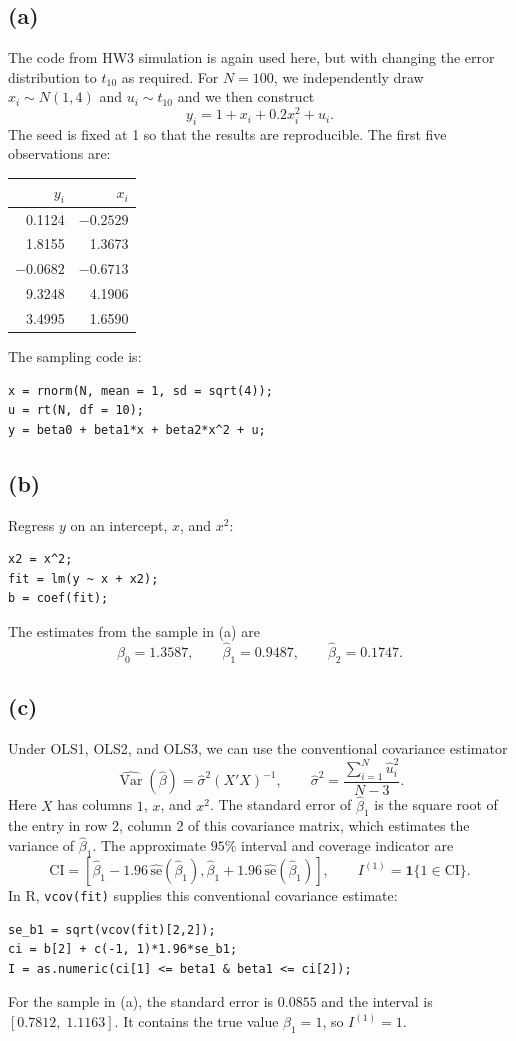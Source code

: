 \documentclass[11pt]{article}
\newcommand{\code}[1]{\texttt{#1}}
\DeclareMathOperator{\Var}{Var}
\begin{document}
\subsection{(a)}
The code from HW3 simulation is again used here, but with changing the error distribution to $t_{10}$
as required. For $N=100$, we independently draw $x_i\sim N(1,4)$ and
$u_i\sim t_{10}$ and we then construct
\[
y_i=1+x_i+0.2x_i^2+u_i.
\]
The seed is fixed at 1 so that the results are reproducible. The first
five observations are:
\begin{center}
\begin{tabular}{rr}
\toprule
$y_i$ & $x_i$ \\
\midrule
0.1124 & $-0.2529$ \\
1.8155 & 1.3673 \\
$-0.0682$ & $-0.6713$ \\
9.3248 & 4.1906 \\
3.4995 & 1.6590 \\
\bottomrule
\end{tabular}
\end{center}
The sampling code is:
\begin{lstlisting}[style=Rcode]
x = rnorm(N, mean = 1, sd = sqrt(4));
u = rt(N, df = 10);
y = beta0 + beta1*x + beta2*x^2 + u;
\end{lstlisting}

\subsection{(b)}
Regress $y$ on an intercept, $x$, and $x^2$:
\begin{lstlisting}[style=Rcode]
x2 = x^2;
fit = lm(y ~ x + x2);
b = coef(fit);
\end{lstlisting}
The estimates from the sample in (a) are
\[
\hat\beta_0=1.3587,\qquad
\hat\beta_1=0.9487,\qquad
\hat\beta_2=0.1747.
\]

\subsection{(c)}
Under OLS1, OLS2, and OLS3, we can use the conventional covariance estimator
\[
\widehat{\Var}(\hat\beta)=\hat\sigma^2(X'X)^{-1},
\qquad
\hat\sigma^2=\frac{\sum_{i=1}^{N}\hat u_i^2}{N-3}.
\]
Here $X$ has columns $1$, $x$, and $x^2$. The standard error of
$\hat\beta_1$ is the square root of the entry in row 2, column 2 of
this covariance matrix, which estimates the variance of $\hat\beta_1$.
The approximate $95\%$ interval and coverage indicator are
\[
\mathrm{CI}=\left[\hat\beta_1-1.96\,\widehat{\text{se}}(\hat\beta_1),
                  \hat\beta_1+1.96\,\widehat{\text{se}}(\hat\beta_1)\right],
\qquad
I^{(1)}=\mathbf{1}\{1\in\mathrm{CI}\}.
\]
In R, \code{vcov(fit)} supplies this conventional covariance estimate:
\begin{lstlisting}[style=Rcode]
se_b1 = sqrt(vcov(fit)[2,2]);
ci = b[2] + c(-1, 1)*1.96*se_b1;
I = as.numeric(ci[1] <= beta1 & beta1 <= ci[2]);
\end{lstlisting}
For the sample in (a), the standard error is $0.0855$ and the interval
is $[0.7812,\;1.1163]$. It contains the true value $\beta_1=1$, so
$I^{(1)}=1$.
\end{document}
